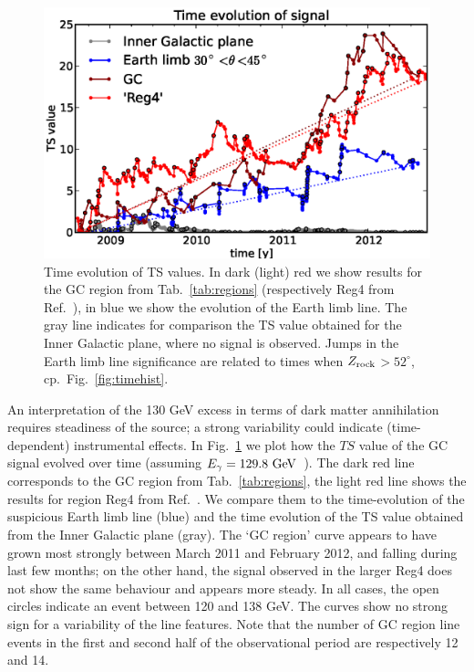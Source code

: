 \documentclass[aps,twocolumn,prd,superscriptaddress,showpacs,nofootinbib,fixfloat]{revtex4}
\newcommand{\GeV}{{\rm ~GeV}}
\newcommand{\zrock}{$Z_{\rm rock}$}
\begin{document}
\begin{figure}
  \begin{center}
    \includegraphics[width=1.0\linewidth]{plots/TS_time.eps}
  \end{center}
  \caption{Time evolution of TS values. In dark (light) red we show results
  for the GC region from Tab.~\ref{tab:regions} (respectively Reg4 from
  Ref.~\cite{Weniger:2012}), in blue we show the evolution of the Earth limb
  line. The gray line indicates for comparison the TS value obtained for the
  Inner Galactic plane, where no signal is observed.  Jumps in the Earth limb
  line significance are related to times when
  \zrock$>52^\circ$, cp.~Fig.~\ref{fig:timehist}.}
  \label{fig:timeevolution}
\end{figure}

An interpretation of the 130 GeV excess in
terms of dark matter annihilation requires steadiness of the source;
a strong variability could
indicate (time-dependent) instrumental effects. In
Fig.~\ref{fig:timeevolution} we plot how the $TS$ value of
the GC signal evolved over time (assuming $E_\gamma=129.8\GeV$~\cite{Weniger:2012}). 
The dark red line corresponds
to the GC region from Tab.~\ref{tab:regions}, the light red line shows the
results for region Reg4 from Ref.~\cite{Weniger:2012}. We
compare them to the time-evolution of the suspicious Earth limb
line (blue) and the time evolution of the TS value obtained from the
Inner Galactic plane (gray). The `GC region' curve appears to have grown most
strongly between March 2011 and February 2012, and falling
during last few months; on the other hand, the signal observed in the larger Reg4
does not show the same behaviour and appears more steady. In all cases, the open circles
indicate an event between 120 and 138 GeV.
The curves show no strong sign for a variability of the line features.  Note
that the number of GC region line events in the first and second half of the
observational period are respectively 12 and 14.
\end{document}
